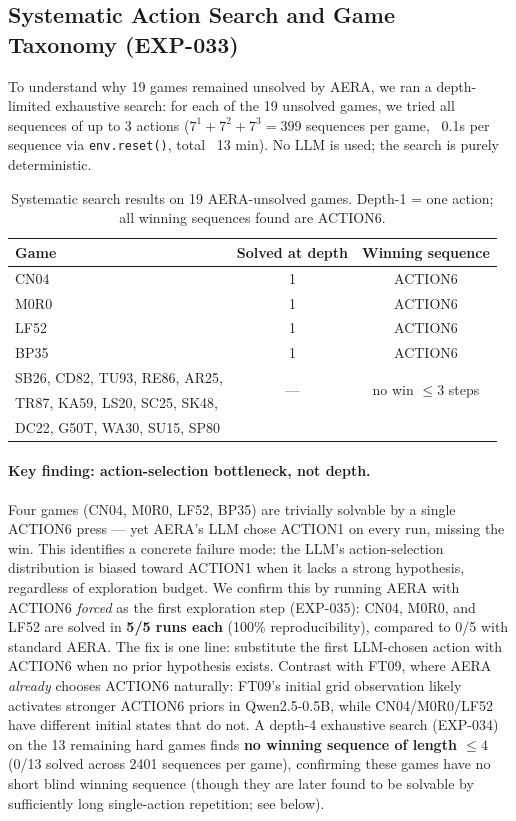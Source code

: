 \documentclass[11pt]{article}
\begin{document}
\subsection{Systematic Action Search and Game Taxonomy (EXP-033)}
\label{sec:systematic}

To understand why 19 games remained unsolved by AERA, we ran a depth-limited exhaustive search: for each of the 19 unsolved games, we tried all sequences of up to 3 actions ($7^1 + 7^2 + 7^3 = 399$ sequences per game, ~0.1s per sequence via \texttt{env.reset()}, total ~13 min). No LLM is used; the search is purely deterministic.

\begin{table}[h]
\centering
\caption{Systematic search results on 19 AERA-unsolved games. Depth-1 = one action; all winning sequences found are ACTION6.}
\label{tab:systematic}
\begin{tabular}{lcc}
\toprule
Game & Solved at depth & Winning sequence \\
\midrule
CN04 & 1 & ACTION6 \\
M0R0 & 1 & ACTION6 \\
LF52 & 1 & ACTION6 \\
BP35 & 1 & ACTION6 \\
\midrule
SB26, CD82, TU93, RE86, AR25, & \multirow{2}{*}{---} & \multirow{2}{*}{no win $\leq 3$ steps} \\
TR87, KA59, LS20, SC25, SK48, & & \\
DC22, G50T, WA30, SU15, SP80 & & \\
\bottomrule
\end{tabular}
\end{table}

\paragraph{Key finding: action-selection bottleneck, not depth.} Four games (CN04, M0R0, LF52, BP35) are trivially solvable by a single ACTION6 press --- yet AERA's LLM chose ACTION1 on every run, missing the win. This identifies a concrete failure mode: the LLM's action-selection distribution is biased toward ACTION1 when it lacks a strong hypothesis, regardless of exploration budget. We confirm this by running AERA with ACTION6 \emph{forced} as the first exploration step (EXP-035): CN04, M0R0, and LF52 are solved in \textbf{5/5 runs each} (100\% reproducibility), compared to 0/5 with standard AERA. The fix is one line: substitute the first LLM-chosen action with ACTION6 when no prior hypothesis exists. Contrast with FT09, where AERA \emph{already} chooses ACTION6 naturally: FT09's initial grid observation likely activates stronger ACTION6 priors in Qwen2.5-0.5B, while CN04/M0R0/LF52 have different initial states that do not. A depth-4 exhaustive search (EXP-034) on the 13 remaining hard games finds \textbf{no winning sequence of length $\leq 4$} (0/13 solved across 2401 sequences per game), confirming these games have no short blind winning sequence (though they are later found to be solvable by sufficiently long single-action repetition; see below).
\end{document}
